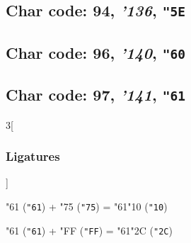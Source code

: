 \documentclass{article}
\newlength{\maxcharwidth}
\begin{document}
\subsection{Char code: 94, {\it'136}, {\tt"5E}}
\label{char_94}


\subsection{Char code: 96, {\it'140}, {\tt"60}}
\label{char_96}


\subsection{Char code: 97, {\it'141}, {\tt"61}}
\label{char_97}


\begin{multicols}{3}[\subsubsection{Ligatures}]

{\testfont\char"61\noboundary} ({\tt"61}) + {\testfont\char"75\noboundary} ({\tt"75}) = {\testfont\char"61\noboundary}{\testfont\char"10\noboundary} ({\tt"10}) 

{\testfont\char"61\noboundary} ({\tt"61}) + {\testfont\char"FF\noboundary} ({\tt"FF}) = {\testfont\char"61\noboundary}{\testfont\char"2C\noboundary} ({\tt"2C}) 

\end{multicols}
\end{document}
